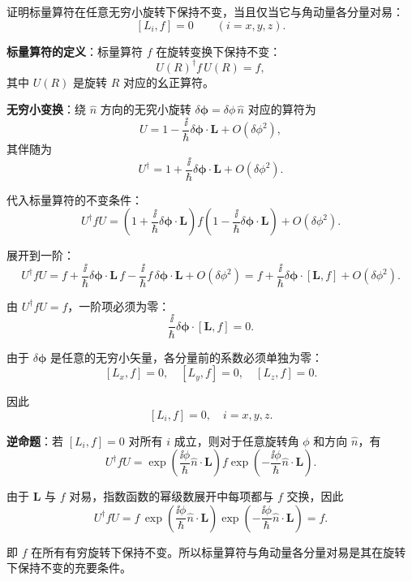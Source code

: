 \begin{question}
证明标量算符在任意无穷小旋转下保持不变，当且仅当它与角动量各分量对易：
\[
[L_i,f]=0\qquad (i=x,y,z).
\]
\end{question}
\begin{solution}
	\textbf{标量算符的定义}：标量算符 $f$ 在旋转变换下保持不变：
	\[
	U(R)^\dagger f\,U(R) = f,
	\]
	其中 $U(R)$ 是旋转 $R$ 对应的幺正算符。

	\textbf{无穷小变换}：绕 $\hat n$ 方向的无究小旋转 $\delta\boldsymbol\phi = \delta\phi\,\hat n$ 对应的算符为
	\[
	U = 1 - \frac{\ii}{\hbar}\delta\boldsymbol\phi\cdot\mathbf L + O(\delta\phi^2),
	\]
	其伴随为
	\[
	U^\dagger = 1 + \frac{\ii}{\hbar}\delta\boldsymbol\phi\cdot\mathbf L + O(\delta\phi^2).
	\]

	代入标量算符的不变条件：
	\[
	U^\dagger f U = \left(1+\frac{\ii}{\hbar}\delta\boldsymbol\phi\cdot\mathbf L\right)
	f\left(1-\frac{\ii}{\hbar}\delta\boldsymbol\phi\cdot\mathbf L\right) + O(\delta\phi^2).
	\]

	展开到一阶：
	\[
	U^\dagger f U = f + \frac{\ii}{\hbar}\delta\boldsymbol\phi\cdot\mathbf L\,f
	- \frac{\ii}{\hbar}f\,\delta\boldsymbol\phi\cdot\mathbf L + O(\delta\phi^2)
	= f + \frac{\ii}{\hbar}\delta\boldsymbol\phi\cdot[\mathbf L,f] + O(\delta\phi^2).
	\]

	由 $U^\dagger f U = f$，一阶项必须为零：
	\[
	\frac{\ii}{\hbar}\delta\boldsymbol\phi\cdot[\mathbf L,f] = 0.
	\]

	由于 $\delta\boldsymbol\phi$ 是任意的无穷小矢量，各分量前的系数必须单独为零：
	\[
	[L_x,f]=0,\quad [L_y,f]=0,\quad [L_z,f]=0.
	\]

	因此
	\[
	\boxed{[L_i,f]=0,\quad i=x,y,z}.
	\]

	\textbf{逆命题}：若 $[L_i,f]=0$ 对所有 $i$ 成立，则对于任意旋转角 $\phi$ 和方向 $\hat n$，有
	\[
	U^\dagger f U = \exp\!\left(\frac{\ii\phi}{\hbar}\hat n\cdot\mathbf L\right) f
	\exp\!\left(-\frac{\ii\phi}{\hbar}\hat n\cdot\mathbf L\right).
	\]

	由于 $\mathbf L$ 与 $f$ 对易，指数函数的幂级数展开中每项都与 $f$ 交换，因此
	\[
	U^\dagger f U = f\,\exp\!\left(\frac{\ii\phi}{\hbar}\hat n\cdot\mathbf L\right)
	\exp\!\left(-\frac{\ii\phi}{\hbar}\hat n\cdot\mathbf L\right)=f.
	\]

	即 $f$ 在所有有穷旋转下保持不变。所以标量算符与角动量各分量对易是其在旋转下保持不变的充要条件。
	\end{solution}

